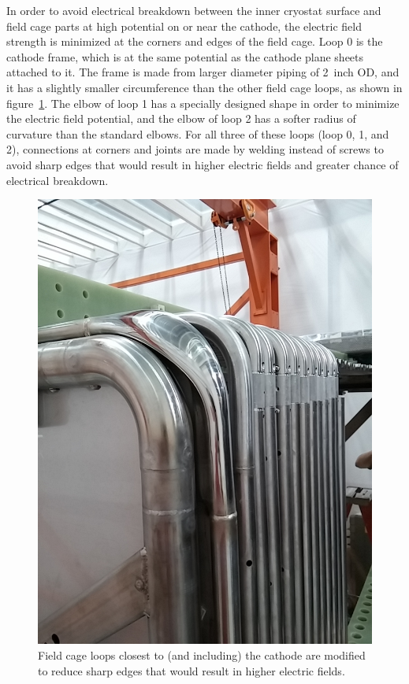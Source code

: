 In order to avoid electrical breakdown between the inner cryostat surface and field cage parts at high potential on or near the cathode, the electric field strength is minimized at the corners and edges of the field cage. Loop 0 is the cathode frame, which is at the same potential as the cathode plane sheets attached to it. The frame is made from larger diameter piping of 2~inch OD, and it has a slightly smaller circumference than the other field cage loops, as shown in figure~\ref{fig:tpc-smooshed-elbow}. The elbow of loop 1 has a specially designed shape in order to minimize the electric field potential, and the elbow of loop 2 has a softer radius of curvature than the standard elbows. For all three of these loops (loop 0, 1, and 2), connections at corners and joints are made by welding instead of screws to avoid sharp edges that would result in higher electric fields and greater chance of electrical breakdown.

\begin{figure}[htb]
\centering	
\includegraphics[width=0.8\linewidth]{figures/tpc-smooshed-elbow-3.jpg}
\caption{Field cage loops closest to (and including) the cathode are modified to reduce sharp edges that would result in higher electric fields.}
\label{fig:tpc-smooshed-elbow}
\end{figure}

